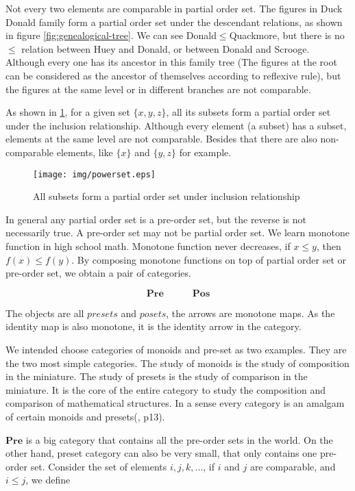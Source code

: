 \documentclass{article}
\begin{document}
Not every two elements are comparable in partial order set. The figures in Duck Donald family form a partial order set under the descendant relations, as shown in figure \ref{fig:genealogical-tree}. We can see Donald$\leq$Quackmore, but there is no $\leq$ relation between Huey and Donald, or between Donald and Scrooge. Although every one has its ancestor in this family tree (The figures at the root can be considered as the ancestor of themselves according to reflexive rule), but the figures at the same level or in different branches are not comparable.

As shown in \ref{fig:powerset}, for a given set $\{x, y, z\}$, all its subsets form a partial order set under the inclusion relationship. Although every element (a subset) has a subset, elements at the same level are not comparable. Besides that there are also non-comparable elements, like $\{x\}$ and $\{y, z\}$ for example.

\begin{figure}[htbp]
 \centering
 \texttt{[image: img/powerset.eps]}
 \caption{All subsets form a partial order set under inclusion relationship}
 \label{fig:powerset}
\end{figure}

 
In general any partial order set is a pre-order set, but the reverse is not necessarily true. A pre-order set may not be partial order set. We learn monotone function in high school math. Monotone function never decreases, if $x \leq y$, then $f(x) \leq f(y)$. By composing monotone functions on top of partial order set or pre-order set, we obtain a pair of categories.

\[
\pmb{Pre} \quad \quad \quad \pmb{Pos}
\]

The objects are all $presets$ and $posets$, the arrows are monotone maps. As the identity map is also monotone, it is the identity arrow in the category.

We intended choose categories of monoids and pre-set as two examples. They are the two most simple categories. The study of monoids is the study of composition in the miniature. The study of presets is the study of comparison in the miniature. It is the core of the entire category to study the composition and comparison of mathematical structures. In a sense every category is an amalgam of certain monoids and presets(\cite{Simmons2011}, p13).

$\pmb{Pre}$ is a big category that contains all the pre-order sets in the world. On the other hand, preset category can also be very small, that only contains one pre-order set. Consider the set of elements $i, j, k, ...$, if $i$ and $j$ are comparable, and $i \leq j$, we define
\end{document}
